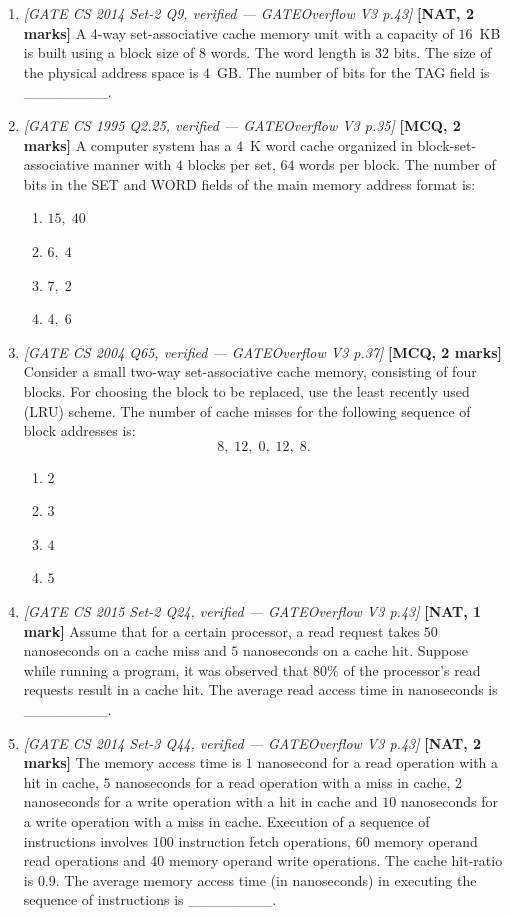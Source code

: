 \documentclass[11pt]{article}
\begin{document}
\begin{enumerate}
\item[\textbf{Q4}] \textit{[GATE CS 2014 Set-2 Q9, verified --- GATEOverflow V3 p.43]} \textbf{[NAT, 2 marks]} A 4-way set-associative cache memory unit with a capacity of $16$~KB is built using a block size of $8$ words. The word length is $32$ bits. The size of the physical address space is $4$~GB. The number of bits for the TAG field is \_\_\_\_\_\_\_\_.

\item[\textbf{Q5}] \textit{[GATE CS 1995 Q2.25, verified --- GATEOverflow V3 p.35]} \textbf{[MCQ, 2 marks]} A computer system has a $4$~K word cache organized in block-set-associative manner with $4$ blocks per set, $64$ words per block. The number of bits in the SET and WORD fields of the main memory address format is:
\begin{enumerate}
  \item[(A)] $15,\;40$
  \item[(B)] $6,\;4$
  \item[(C)] $7,\;2$
  \item[(D)] $4,\;6$
\end{enumerate}

\item[\textbf{Q6}] \textit{[GATE CS 2004 Q65, verified --- GATEOverflow V3 p.37]} \textbf{[MCQ, 2 marks]} Consider a small two-way set-associative cache memory, consisting of four blocks. For choosing the block to be replaced, use the least recently used (LRU) scheme. The number of cache misses for the following sequence of block addresses is:
\[
8,\;12,\;0,\;12,\;8 .
\]
\begin{enumerate}
  \item[(A)] $2$
  \item[(B)] $3$
  \item[(C)] $4$
  \item[(D)] $5$
\end{enumerate}

\item[\textbf{Q7}] \textit{[GATE CS 2015 Set-2 Q24, verified --- GATEOverflow V3 p.43]} \textbf{[NAT, 1 mark]} Assume that for a certain processor, a read request takes $50$ nanoseconds on a cache miss and $5$ nanoseconds on a cache hit. Suppose while running a program, it was observed that $80\%$ of the processor's read requests result in a cache hit. The average read access time in nanoseconds is \_\_\_\_\_\_\_\_.

\item[\textbf{Q8}] \textit{[GATE CS 2014 Set-3 Q44, verified --- GATEOverflow V3 p.43]} \textbf{[NAT, 2 marks]} The memory access time is $1$ nanosecond for a read operation with a hit in cache, $5$ nanoseconds for a read operation with a miss in cache, $2$ nanoseconds for a write operation with a hit in cache and $10$ nanoseconds for a write operation with a miss in cache. Execution of a sequence of instructions involves $100$ instruction fetch operations, $60$ memory operand read operations and $40$ memory operand write operations. The cache hit-ratio is $0.9$. The average memory access time (in nanoseconds) in executing the sequence of instructions is \_\_\_\_\_\_\_\_.


\end{enumerate}
\end{document}

